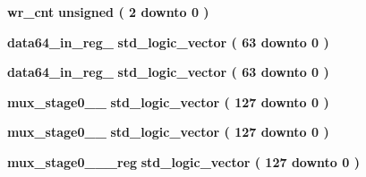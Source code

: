 \begin{DoxyCompactItemize}
\item 
{\bf wr\+\_\+cnt} {\bfseries \textcolor{comment}{unsigned}\textcolor{vhdlchar}{ }\textcolor{vhdlchar}{(}\textcolor{vhdlchar}{ }\textcolor{vhdlchar}{ } \textcolor{vhdldigit}{2} \textcolor{vhdlchar}{ }\textcolor{keywordflow}{downto}\textcolor{vhdlchar}{ }\textcolor{vhdlchar}{ } \textcolor{vhdldigit}{0} \textcolor{vhdlchar}{ }\textcolor{vhdlchar}{)}\textcolor{vhdlchar}{ }} 
\item 
{\bf data64\+\_\+in\+\_\+reg\+\_} {\bfseries \textcolor{comment}{std\+\_\+logic\+\_\+vector}\textcolor{vhdlchar}{ }\textcolor{vhdlchar}{(}\textcolor{vhdlchar}{ }\textcolor{vhdlchar}{ } \textcolor{vhdldigit}{63} \textcolor{vhdlchar}{ }\textcolor{keywordflow}{downto}\textcolor{vhdlchar}{ }\textcolor{vhdlchar}{ } \textcolor{vhdldigit}{0} \textcolor{vhdlchar}{ }\textcolor{vhdlchar}{)}\textcolor{vhdlchar}{ }} 
\item 
{\bf data64\+\_\+in\+\_\+reg\+\_} {\bfseries \textcolor{comment}{std\+\_\+logic\+\_\+vector}\textcolor{vhdlchar}{ }\textcolor{vhdlchar}{(}\textcolor{vhdlchar}{ }\textcolor{vhdlchar}{ } \textcolor{vhdldigit}{63} \textcolor{vhdlchar}{ }\textcolor{keywordflow}{downto}\textcolor{vhdlchar}{ }\textcolor{vhdlchar}{ } \textcolor{vhdldigit}{0} \textcolor{vhdlchar}{ }\textcolor{vhdlchar}{)}\textcolor{vhdlchar}{ }} 
\item 
{\bf mux\+\_\+stage0\+\_\+\_} {\bfseries \textcolor{comment}{std\+\_\+logic\+\_\+vector}\textcolor{vhdlchar}{ }\textcolor{vhdlchar}{(}\textcolor{vhdlchar}{ }\textcolor{vhdlchar}{ } \textcolor{vhdldigit}{127} \textcolor{vhdlchar}{ }\textcolor{keywordflow}{downto}\textcolor{vhdlchar}{ }\textcolor{vhdlchar}{ } \textcolor{vhdldigit}{0} \textcolor{vhdlchar}{ }\textcolor{vhdlchar}{)}\textcolor{vhdlchar}{ }} 
\item 
{\bf mux\+\_\+stage0\+\_\+\_} {\bfseries \textcolor{comment}{std\+\_\+logic\+\_\+vector}\textcolor{vhdlchar}{ }\textcolor{vhdlchar}{(}\textcolor{vhdlchar}{ }\textcolor{vhdlchar}{ } \textcolor{vhdldigit}{127} \textcolor{vhdlchar}{ }\textcolor{keywordflow}{downto}\textcolor{vhdlchar}{ }\textcolor{vhdlchar}{ } \textcolor{vhdldigit}{0} \textcolor{vhdlchar}{ }\textcolor{vhdlchar}{)}\textcolor{vhdlchar}{ }} 
\item 
{\bf mux\+\_\+stage0\+\_\+\_\+\_\+reg} {\bfseries \textcolor{comment}{std\+\_\+logic\+\_\+vector}\textcolor{vhdlchar}{ }\textcolor{vhdlchar}{(}\textcolor{vhdlchar}{ }\textcolor{vhdlchar}{ } \textcolor{vhdldigit}{127} \textcolor{vhdlchar}{ }\textcolor{keywordflow}{downto}\textcolor{vhdlchar}{ }\textcolor{vhdlchar}{ } \textcolor{vhdldigit}{0} \textcolor{vhdlchar}{ }\textcolor{vhdlchar}{)}\textcolor{vhdlchar}{ }} 

\end{DoxyCompactItemize}
